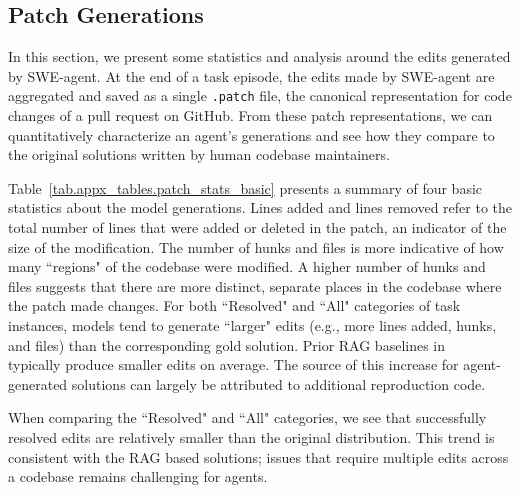 \subsection{Patch Generations}
\label{appx:analyses:patch_generations}

In this section, we present some statistics and analysis around the edits generated by SWE-agent.
At the end of a task episode, the edits made by SWE-agent are aggregated and saved as a single \texttt{.patch} file, the canonical representation for code changes of a pull request on GitHub.
From these patch representations, we can quantitatively characterize an agent's generations and see how they compare to the original solutions written by human codebase maintainers.

Table~\ref{tab.appx_tables.patch_stats_basic} presents a summary of four basic statistics about the model generations.
Lines added and lines removed refer to the total number of lines that were added or deleted in the patch, an indicator of the size of the modification.
The number of hunks and files is more indicative of how many ``regions" of the codebase were modified.
A higher number of hunks and files suggests that there are more distinct, separate places in the codebase where the patch made changes.
For both ``Resolved" and ``All" categories of task instances, models tend to generate ``larger" edits (e.g., more lines added, hunks, and files) than the corresponding gold solution.
Prior RAG baselines in ~\citet{jimenez2024swebench} typically produce smaller edits on average.
The source of this increase for agent-generated solutions can largely be attributed to additional reproduction code.



When comparing the ``Resolved" and ``All" categories, we see that successfully resolved edits are relatively smaller than the original distribution.
This trend is consistent with the RAG based solutions; issues that require multiple edits across a codebase remains challenging for agents.